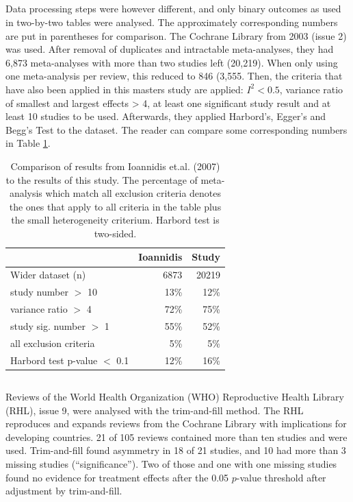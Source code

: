 \documentclass[11pt,a4paper,twoside]{book}\usepackage[]{graphicx}\usepackage[]{color}
\begin{document}
\subsection{\citealp{Ioannidis2007}}
Data processing steps were however different, and only binary outcomes as used in two-by-two tables were analysed. The approximately corresponding numbers are put in parentheses for comparison. The Cochrane Library from 2003 (issue 2) was used. After removal of duplicates and intractable meta-analyses, they had 6,873 meta-analyses with more than two studies left (20,219). When only using one meta-analysis per review, this reduced to 846 (3,555. Then, the criteria that have also been applied in this masters study are applied: $I^2 < 0.5$, variance ratio of smallest and largest effects > 4, at least one significant study result and at least 10 studies to be used. Afterwards, they applied Harbord's, Egger's and Begg's Test to the dataset. The reader can compare some corresponding numbers in Table \ref{ioannidis}.

\begin{table}[ht]
\centering
\begin{tabular}{lrr}
  \hline
 & Ioannidis & Study \\ 
  \hline
Wider dataset (n) & 6873 & 20219 \\ 
  study number $>$ 10 & 13\% & 12\% \\ 
  variance ratio $>$ 4 & 72\% & 75\% \\ 
  study sig. number $>$ 1 & 55\% & 52\% \\ 
  all exclusion criteria & 5\% & 5\% \\ 
  Harbord test p-value $<$ 0.1 & 12\% & 16\% \\ 
   \hline
\end{tabular}
\caption{Comparison of results from Ioannidis et.al. (2007) to the results of this study. The percentage of meta-analysis which match all exclusion criteria denotes the ones that apply to all criteria in the table plus the small heterogeneity criterium. Harbord test is two-sided.} 
\label{ioannidis}
\end{table}


\subsection{\citealp{souza.2007}}
Reviews of the World Health Organization (WHO) Reproductive Health Library (RHL), issue 9, were analysed with the trim-and-fill method. The RHL reproduces and expands reviews from the Cochrane Library with implications for developing countries. 21 of 105 reviews contained more than ten studies and were used. Trim-and-fill found asymmetry in 18 of 21 studies, and 10 had more than 3 missing studies (``significance''). Two of those and one with one missing studies found no evidence for treatment effects after the 0.05 $p$-value threshold after adjustment by trim-and-fill.
\end{document}
